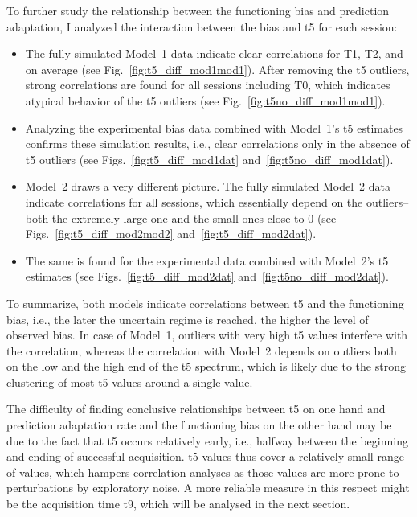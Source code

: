 \documentclass[a4paper]{scrreprt}
\begin{document}
To further study the relationship between the functioning bias and prediction adaptation, I analyzed the interaction between the bias and t5 for each session:
\begin{itemize}
\item The fully simulated Model~1 data indicate clear correlations for T1, T2, and on average (see Fig.~\ref{fig:t5_diff_mod1mod1}). After removing the t5 outliers, strong correlations are found for all sessions including T0, which indicates atypical behavior of the t5 outliers (see Fig.~\ref{fig:t5no_diff_mod1mod1}).
\item Analyzing the experimental bias data combined with Model~1's t5 estimates confirms these simulation results, i.e., clear correlations only in the absence of t5 outliers (see Figs.~\ref{fig:t5_diff_mod1dat} and~\ref{fig:t5no_diff_mod1dat}).
\item Model~2 draws a very different picture. The fully simulated Model~2 data indicate correlations for all sessions, which essentially depend on the outliers--both the extremely large one and the small ones close to 0 (see Figs.~\ref{fig:t5_diff_mod2mod2} and~\ref{fig:t5_diff_mod2dat}).
\item The same is found for the experimental data combined with Model~2's t5 estimates (see Figs.~\ref{fig:t5_diff_mod2dat} and~\ref{fig:t5no_diff_mod2dat}).
\end{itemize}

To summarize, both models indicate correlations between t5 and the functioning bias, i.e., the later the uncertain regime is reached, the higher the level of observed bias. In case of Model~1, outliers with very high t5 values interfere with the correlation, whereas the correlation with Model~2 depends on outliers both on the low and the high end of the t5 spectrum, which is likely due to the strong clustering of most t5 values around a single value.

The difficulty of finding conclusive relationships between t5 on one hand and prediction adaptation rate and the functioning bias on the other hand may be due to the fact that t5 occurs relatively early, i.e., halfway between the beginning and ending of successful acquisition. t5 values thus cover a relatively small range of values, which hampers correlation analyses as those values are more prone to perturbations by exploratory noise. A more reliable measure in this respect might be the acquisition time t9, which will be analysed in the next section.
\end{document}
